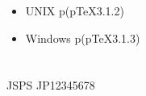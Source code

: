 \documentclass{article}
\begin{document}
 
\begin{itemize}
\item UNIX  p\LaTeXe (p\TeX3.1.2)
\item Windows  p\LaTeXe (p\TeX3.1.3)
\end{itemize}
 


\section{ }

 
 
 
 
 
 
 
 
 
 
 
 
 
 
 
 


 


\section*{ }
 
 JSPS  JP12345678 














\end{document}
